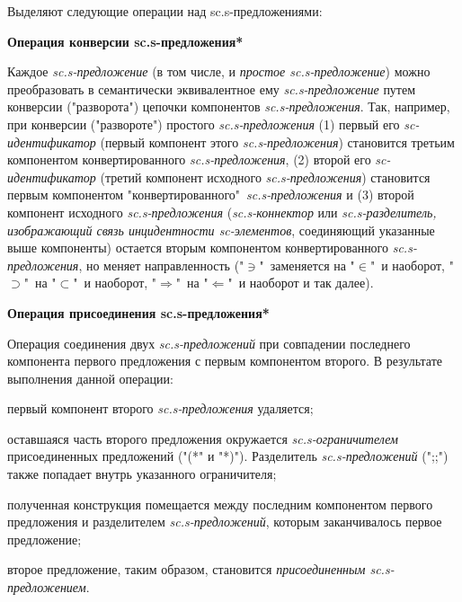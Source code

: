 Выделяют следующие операции над sc.s-предложениями:
\begin{textitemize}
	\item \textbf{Операция конверсии sc.s-предложения*}
	
		Каждое \textit{sc.s-предложение} (в том числе, и \textit{простое sc.s-предложение}) можно преобразовать в семантически эквивалентное ему \textit{sc.s-предложение} путем конверсии ("разворота"{}) цепочки компонентов \textit{sc.s-предложения}. Так, например, при конверсии ("развороте") простого \textit{\mbox{sc.s-предложения}} (1) первый его \textit{\mbox{sc-идентификатор}} (первый компонент этого \textit{\mbox{sc.s-предложения}}) становится третьим компонентом конвертированного \textit{ \mbox{sc.s-предложения}}, (2) второй его \textit{\mbox{sc-идентификатор}} (третий компонент исходного \textit{\mbox{sc.s-предложения}}) становится первым компонентом "конвертированного"\ \textit{\mbox{sc.s-предложения}} и (3) второй компонент исходного \textit{\mbox{sc.s-предложения}} (\textit{\mbox{sc.s-коннектор}} или \textit{\mbox{sc.s-разделитель}, изображающий связь инцидентности \mbox{sc-элементов}}, соединяющий указанные выше компоненты) остается вторым компонентом конвертированного \textit{\mbox{sc.s-предложения}}, но меняет направленность ("$\ni$"\ заменяется на "$\in$"\ и наоборот, "$\supset$"\ на "$\subset$"\ и наоборот, "$\Rightarrow$"\ на "$\Leftarrow$"\ и наоборот и так далее).
	
	\item \textbf{Операция присоединения sc.s-предложения*}
		
		Операция соединения двух \textit{sc.s-предложений} при совпадении последнего компонента первого предложения с первым компонентом второго.
		В результате выполнения данной операции:
		\begin{textitemize}
			\item первый компонент второго \textit{sc.s-предложения} удаляется;
			\item оставшаяся часть второго предложения окружается \textit{sc.s-ограничителем} присоединенных предложений ("(*"{} и "*)"{}). Разделитель \textit{sc.s-предложений} (";;"{}) также попадает внутрь указанного ограничителя;
			\item полученная конструкция помещается между последним компонентом первого предложения и разделителем \textit{sc.s-предложений}, которым заканчивалось первое предложение;
			\item второе предложение, таким образом, становится \textit{присоединенным sc.s-предложением}.
		\end{textitemize}
	

\end{textitemize}
